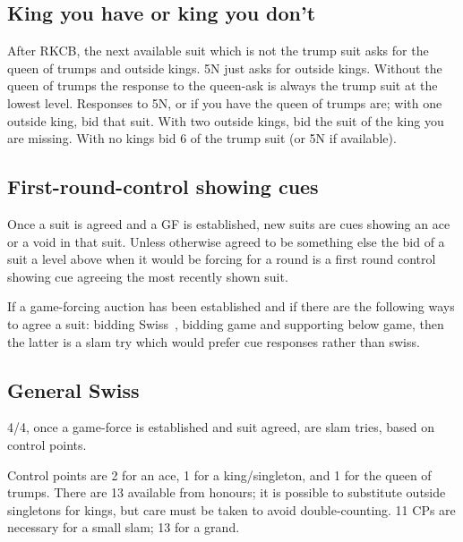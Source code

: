 \documentclass[a4paper,14pt]{extarticle}
\begin{document}
\subsection{King you have or king you don't}
\label{sec:kyhokyd}

After RKCB, the next available suit which is not the trump suit asks for the
queen of trumps and outside kings. 5N just asks for outside kings. Without the
queen of trumps the response to the queen-ask is always the trump suit at the
lowest level. Responses to 5N, or if you have the queen of trumps are; with one
outside king, bid that suit. With two outside kings, bid the suit of the king
you are missing. With no kings bid 6 of the trump suit (or 5N if available).

\subsection{First-round-control showing cues}
\label{sec:cues}

Once a suit is agreed and a GF is established, new suits are cues showing an
ace or a void in that suit. Unless otherwise agreed to be something else the
bid of a suit a level above when it would be forcing for a round is a first round
control showing cue agreeing the most recently shown suit.

If a game-forcing auction has been established and if there are the following
ways to agree a suit: bidding Swiss~, bidding game and
supporting below game, then the latter is a slam try which would prefer cue
responses rather than swiss.

\newpage

\subsection{General Swiss}
\label{sec:swiss}
\label{note:19}

4\clubs/4\diamonds, once a game-force is established and suit agreed, are slam tries, based
on control points.

Control points are 2 for an ace, 1 for a king/singleton, and 1 for the queen of
trumps.  There are 13 available from honours; it is possible to substitute
outside singletons for kings, but care must be taken to avoid double-counting.
11 CPs are necessary for a small slam; 13 for a grand.
\end{document}
